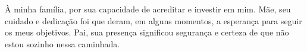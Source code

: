 À minha família, por sua capacidade de acreditar e investir em mim. Mãe, seu cuidado e dedicação foi que deram, em alguns momentos, a esperança para seguir os meus objetivos. Pai, sua presença significou segurança e certeza de que não estou sozinho nessa caminhada.